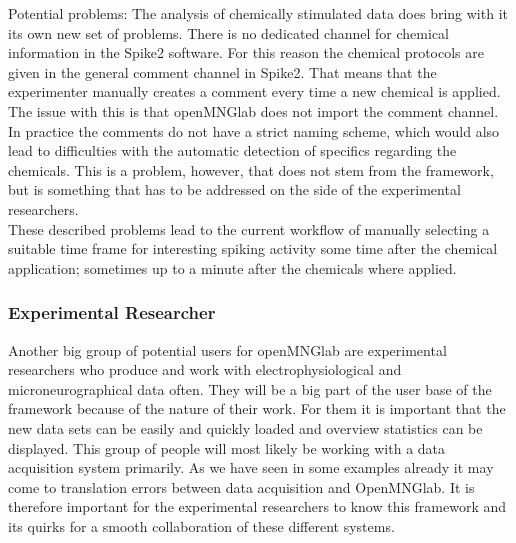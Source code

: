Potential problems: The analysis of chemically stimulated data does bring with it its own new set of problems. There is no dedicated channel for chemical information in the Spike2 software. For this reason the chemical protocols are given in the general comment channel in Spike2. That means that the experimenter manually creates a comment every time a new chemical is applied. The issue with this is that openMNGlab does not import the comment channel. In practice the comments do not have a strict naming scheme, which would also lead to difficulties with the automatic detection of specifics regarding the chemicals. This is a problem, however, that does not stem from the framework, but is something that has to be addressed on the side of the experimental researchers.\\
These described problems lead to the current workflow of manually selecting a suitable time frame for interesting spiking activity some time after the chemical application; sometimes up to a minute after the chemicals where applied.

\subsubsection{Experimental Researcher}
Another big group of potential users for openMNGlab are experimental researchers who produce and work with electrophysiological and microneurographical data often. They will be a big part of the user base of the framework because of the nature of their work. For them it is important that the new data sets can be easily and quickly loaded and overview statistics can be displayed. This group of people will most likely be working with a data acquisition system primarily. As we have seen in some examples already it may come to translation errors between data acquisition and OpenMNGlab. It is therefore important for the experimental researchers to know this framework and its quirks for a smooth collaboration of these different systems.

